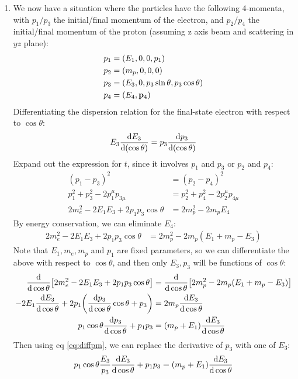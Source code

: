 \documentclass[12pt]{article}
\begin{document}
\begin{enumerate}[label=\alph*)]
\item We now have a situation where the particles have the following 4-momenta, with $p_1/p_3$ the initial/final momentum of the electron, and $p_2/p_4$ the initial/final momentum of the proton (assuming z axis beam and scattering in $yz$ plane):
  \begin{align*}
    p_1&=(E_1,0,0,p_1)\\
    p_2&=(m_p,0,0,0)\\
    p_3&=(E_3,0,p_3\sin\theta,p_3\cos\theta)\\
    p_4&=(E_4,\vb{p}_4)
  \end{align*}
  Differentiating the dispersion relation for the final-state electron with respect to $\cos\theta$:
  \begin{equation}
    \label{eq:diffpm}
    E_3\dv{E_3}{(\cos\theta)}=p_3\dv{p_3}{(\cos\theta)}
  \end{equation}
  Expand out the expression for $t$, since it involves $p_1$ and $p_3$ or $p_2$ and $p_4$:
  \begin{align*}
    (p_1-p_3)^2&=(p_2-p_4)^2\\
    p_1^2+p_3^2-2p_1^\mu p_{3\mu}&=p_2^2+p_4^2-2p_2^\mu p_{4\mu}\\
    2m_e^2-2E_1E_3+2p_1p_3\cos\theta&=2m_p^2-2m_pE_4
  \end{align*}
  By energy conservation, we can eliminate $E_4$:
  \begin{align*}
    2m_e^2-2E_1E_3+2p_1p_3\cos\theta&=2m_p^2-2m_p(E_1+m_p-E_3)
  \end{align*}
  Note that $E_1,m_e,m_p$ and $p_1$ are fixed parameters, so we can differentiate the above with respect to $\cos\theta$, and then only $E_3,p_3$ will be functions of $\cos\theta$:
  \begin{align*}
    \dv{\cos\theta}\qty[2m_e^2-2E_1E_3+2p_1p_3\cos\theta]
    &=\dv{\cos\theta}\qty[2m_p^2-2m_p(E_1+m_p-E_3)]\\
    -2E_1\dv{E_3}{\cos\theta}+2p_1\qty(\dv{p_3}{\cos\theta}\cos\theta+p_3)
    &=2m_p\dv{E_3}{\cos\theta}\\
    p_1\cos\theta\dv{p_3}{\cos\theta}+p_1p_3&=(m_p+E_1)\dv{E_3}{\cos\theta}
  \end{align*}
  Then using eq \eqref{eq:diffpm}, we can replace the derivative of $p_3$ with one of $E_3$:
  \begin{align*}
    p_1\cos\theta\frac{E_3}{p_3}\dv{E_3}{\cos\theta}+p_1p_3
    &=(m_p+E_1)\dv{E_3}{\cos\theta}\\

\end{align*}
\end{enumerate}
\end{document}
